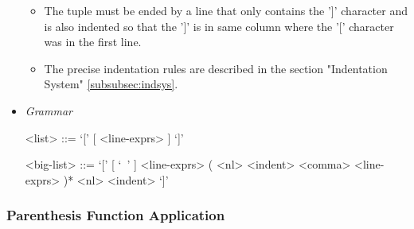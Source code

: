 \documentclass{article}
\begin{document}
\begin{itemize}
\begin{itemize}
  \item
  The tuple must be ended by a line that only contains the ']' character and is 
  also indented so that the ']' is in same column where the '[' character was in
  the first line.

  \item
  The precise indentation rules are described in the section
  "Indentation System" \ref{subsubsec:indsys}.
  \end{itemize}

\item \textit{Grammar}
\begin{grammar}
<list> ::= `[' [ <line-exprs> ] `]'

<big-list> ::= 
`[' [ `\ ' ] <line-exprs> ( <nl> <indent> <comma> <line-exprs> )* <nl> <indent> `]'
\end{grammar}

\end{itemize}

\subsubsection{Parenthesis Function Application}
\label{subsec:parenfuncapp}
\end{document}
